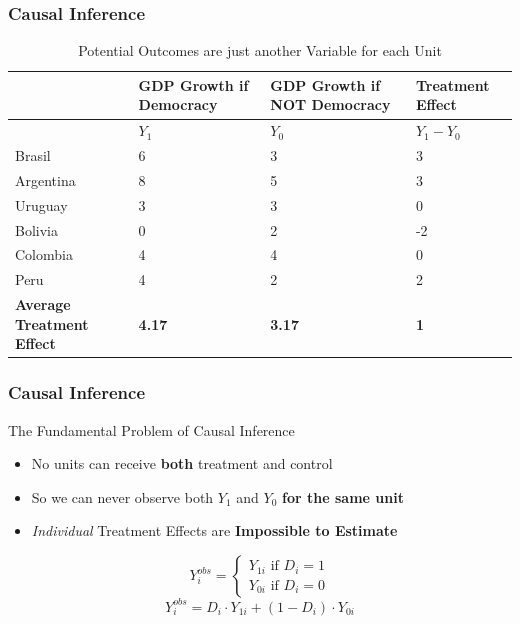 \documentclass[xcolor=x11names,compress]{beamer}\usepackage[]{graphicx}\usepackage[]{color}
\renewcommand{\(}{\begin{columns}}
\renewcommand{\)}{\end{columns}}
\newcommand{\<}[1]{\begin{column}{#1}}
\renewcommand{\>}{\end{column}}
\begin{document}
\begin{frame}
\frametitle{Causal Inference}
\footnotesize
\begin{table}[htbp]
  \centering
  \caption{Potential Outcomes are just another Variable for each Unit}
    \begin{tabular}{|p{2.4cm}|p{2.4cm}|p{2.4cm}|p{2.4cm}|}
    \hline
          & \multicolumn{1}{p{2.4cm}|}{GDP Growth if Democracy} & \multicolumn{1}{p{2.4cm}|}{GDP Growth if  NOT Democracy} & Treatment Effect \bigstrut\\
    \hline
          & \multicolumn{1}{p{2.4cm}|}{$Y_1$} & \multicolumn{1}{l|}{$Y_0$} & \multicolumn{1}{l|}{$Y_{1} - Y_{0}$} \bigstrut\\
    \hline
    Brasil & 6     & 3     & 3 \bigstrut\\
    \hline
    Argentina & 8    & 5     & 3 \bigstrut\\
    \hline
    Uruguay & 3 & 3 & 0  \bigstrut\\
    \hline
    Bolivia & 0     & 2     & -2 \bigstrut\\
    \hline
    Colombia & 4    & 4    & 0 \bigstrut\\
    \hline
    Peru & 4     & 2     & 2 \bigstrut\\
    \hline
    \textbf{Average Treatment Effect} & \textbf{4.17} & \textbf{3.17} & \textbf{1} \bigstrut\\
    \hline
    \end{tabular}%
  \label{tab:addlabel}%
\end{table}%
\normalsize
\end{frame}

\begin{frame}
\frametitle{Causal Inference}
\begin{block}{The Fundamental Problem of Causal Inference}
\begin{itemize}
\item No units can receive \textbf{both} treatment and control
\pause
\item So we can never observe both $Y_1$ and $Y_0$ \textbf{for the same unit}
\pause
\item \textit{Individual} Treatment Effects are \textbf{Impossible to Estimate}
\end{itemize}
\end{block}
\pause
\[
Y_{i}^{obs} = 
\begin{cases}
Y_{1i} \text{ if } D_i=1 \\
Y_{0i} \text{ if } D_i=0
\end{cases}
\]
\pause
$$Y_{i}^{obs} = D_i \cdot Y_{1i} + (1-D_i) \cdot Y_{0i}$$
\end{frame}
\end{document}
